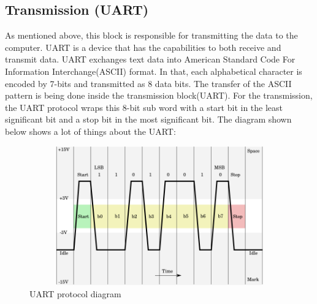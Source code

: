 \documentclass[12pt,a4paper]{article}
\begin{document}
\subsection{Transmission (UART)}
As mentioned above, this block is responsible for transmitting the data to the computer. UART is a device that has the capabilities to both receive and transmit data. UART exchanges text data into American Standard Code For Information Interchange(ASCII)  format. In that, each alphabetical character is encoded by 7-bits and transmitted as 8 data bits. The transfer of the ASCII pattern is being done inside the transmission block(UART). For the transmission, the UART protocol wraps this 8-bit sub word with a start bit in the least significant bit and a stop bit in the most significant bit. The diagram shown below shows a lot of things about the UART:\\


\begin{figure}[H]
\centering
\includegraphics[width=16cm,height=6cm]{UARTprotocol.png}
\caption{UART protocol diagram}
\label{UART protocol diagram}
\end{figure}
\end{document}
